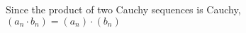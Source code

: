 \documentclass[preview]{standalone}
\begin{document}
\begin{center}
Since the product of two Cauchy sequences is Cauchy,\\$(a_n \cdot b_n) = (a_n) \cdot (b_n)$
\end{center}
\end{document}
